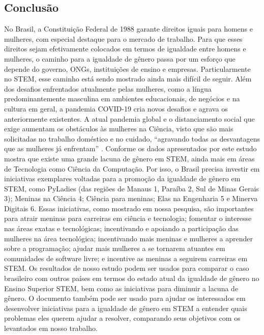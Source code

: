 \subsection{Conclusão}

No Brasil, a Constituição Federal de 1988 garante direitos iguais para homens e mulheres, com especial destaque para o mercado de trabalho. Para que esses direitos sejam efetivamente colocados em termos de igualdade entre homens e mulheres, o caminho para a igualdade de gênero passa por um esforço que depende do governo, ONGs, instituições de ensino e empresas. Particularmente no STEM, esse caminho está sendo mostrado ainda mais difícil de seguir. Além dos desafios enfrentados atualmente pelas mulheres, como a língua predominantemente masculina em ambientes educacionais, de negócios e na cultura em geral, a pandemia COVID-19 cria novos desafios e agrava os anteriormente existentes. A atual pandemia global e o distanciamento social que exige aumentam os obstáculos às mulheres na Ciência, visto que são mais solicitadas no trabalho doméstico e no cuidado, “agravando todas as desvantagens que as mulheres já enfrentam” \citep{scientists_scientist_nodate}. Conforme os dados apresentados por este estudo mostra que existe uma grande lacuna de gênero em STEM, ainda mais em áreas de Tecnologia como Ciência da Computação. Por isso, o Brasil precisa investir em iniciativas exemplares voltadas para a promoção da igualdade de gênero em STEM, como PyLadies (das regiões de Manaus 1, Paraíba 2, Sul de Minas Gerais 3); Meninas na Ciência 4; Ciência para meninas; Elas na Engenharia 5 e Minerva Digitais 6. Essas iniciativas, como mostrado em nossa pesquisa, são importantes para atrair meninas para carreiras em ciência e tecnologia; fomentar o interesse nas áreas exatas e tecnológicas; incentivando e apoiando a participação das mulheres na área tecnológica; incentivando mais meninas e mulheres a aprender sobre a programação; ajudar mais mulheres a se tornarem atuantes em comunidades de software livre; e
incentive as meninas a seguirem carreiras em STEM. Os resultados de nosso estudo podem ser usados para comparar o caso brasileiro com outros países em termos do estado atual da igualdade de gênero no Ensino Superior STEM, bem como as iniciativas para diminuir a lacuna de gênero. O documento também pode ser usado para ajudar os interessados em desenvolver iniciativas para a igualdade de gênero em STEM a entender quais problemas eles querem ajudar a resolver, comparando seus objetivos com os levantados em nosso trabalho.




